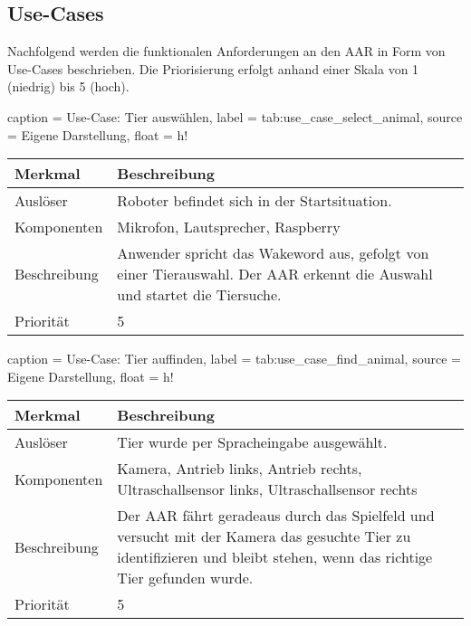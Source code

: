 \subsection{Use-Cases}

Nachfolgend werden die funktionalen Anforderungen an den \ac{AAR} in Form von Use-Cases beschrieben.
Die Priorisierung erfolgt anhand einer Skala von 1 (niedrig) bis 5 (hoch).


\begin{dhbwtable}{%
    caption	= Use-Case: Tier auswählen,
    label	= tab:use_case_select_animal,
    source	= Eigene Darstellung,
    float = h!
}
    \begin{tabularx}{\textwidth}{lX}
        \toprule
        \textbf{Merkmal}     & \textbf{Beschreibung}  \\\midrule
        Auslöser     & Roboter befindet sich in der Startsituation.\\
        Komponenten  & Mikrofon, Lautsprecher, Raspberry\\
        Beschreibung & Anwender spricht das Wakeword aus, gefolgt von einer Tierauswahl. Der \ac{AAR} erkennt die Auswahl und startet die Tiersuche.\\
        Priorität    & 5 \\\bottomrule
    \end{tabularx}    
\end{dhbwtable}

\begin{dhbwtable}{%
    caption	= Use-Case: Tier auffinden,
    label	= tab:use_case_find_animal,
    source	= Eigene Darstellung,
    float = h!
}
    \begin{tabularx}{\textwidth}{lX}
        \toprule
        \textbf{Merkmal}     & \textbf{Beschreibung}  \\\midrule
        Auslöser     & Tier wurde per Spracheingabe ausgewählt.\\
        Komponenten  & Kamera, Antrieb links, Antrieb rechts, Ultraschallsensor links, Ultraschallsensor rechts\\
        Beschreibung & Der \ac{AAR} fährt geradeaus durch das Spielfeld und versucht mit der Kamera das gesuchte Tier zu identifizieren und bleibt stehen, wenn das richtige Tier gefunden wurde.\\
        Priorität    & 5 \\\bottomrule
    \end{tabularx}    
\end{dhbwtable}

